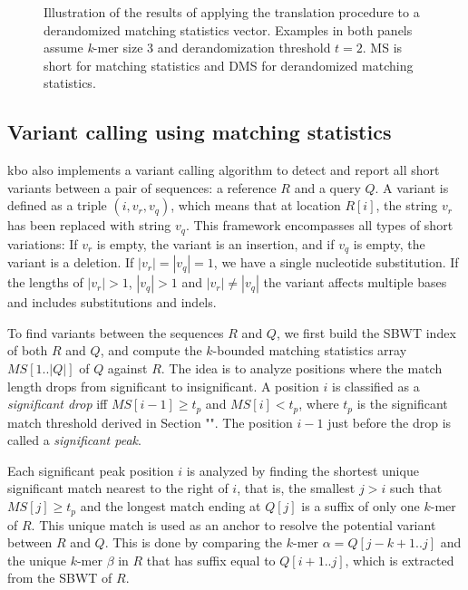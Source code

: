 \documentclass[unnumsec,webpdf,contemporary,large]{oup-authoring-template}%
\theoremstyle{thmstyleone}%
\theoremstyle{thmstyletwo}%
\theoremstyle{thmstylethree}%
\begin{document}
\begin{figure}[t]
    \centering
    
    {}
    \caption{Illustration of the results of applying the translation procedure to a derandomized matching statistics vector. Examples in both panels assume \emph{k}-mer size 3 and derandomization threshold $t=2$. MS is short for matching statistics and DMS for derandomized matching statistics.}
    \label{fig:translate_cases}
\end{figure}

\subsection{Variant calling using matching statistics}

{\sf kbo} also implements a variant calling algorithm to detect and report all short variants between a pair of sequences: a reference $R$ and  a query $Q$. A variant is defined as a triple $(i, v_r, v_q)$, which means that at location $R[i]$, the string $v_r$ has been replaced with string $v_q$. This framework encompasses all types of short variations: If $v_r$ is empty, the variant is an insertion, and if $v_q$ is empty, the variant is a deletion. If $|v_r| = |v_q| = 1$, we have a single nucleotide substitution. If the lengths of $|v_r|>1$, $|v_q|>1$ and $|v_r| \neq|v_q|$ the variant affects multiple bases and includes substitutions and indels. %

To find variants between the sequences $R$ and $Q$, we first build the SBWT index of both $R$ and $Q$, and compute the $k$-bounded matching statistics array $MS[1..|Q|]$ of $Q$ against $R$. The idea is to analyze positions where the match length drops from significant to insignificant. A position $i$ is classified as a \emph{significant drop} iff $MS[i-1] \geq t_p$ and $MS[i] < t_p$, where $t_p$ is the significant match threshold derived in Section "". %
The position $i-1$ just before the drop is called a \emph{significant peak}.

Each significant peak position $i$ is analyzed by finding the shortest unique significant match nearest to the right of $i$, that is, the smallest $j > i$ such that $MS[j] \geq t_p$ and the longest match ending at $Q[j]$ is a suffix of only one $k$-mer of $R$. This unique match is used as an anchor to resolve the potential variant between $R$ and $Q$. This is done by comparing the $k$-mer $\alpha = Q[j-k+1..j]$ and the unique $k$-mer $\beta$ in $R$ that has suffix equal to $Q[i+1..j]$, which is extracted from the SBWT of $R$. 
\end{document}

